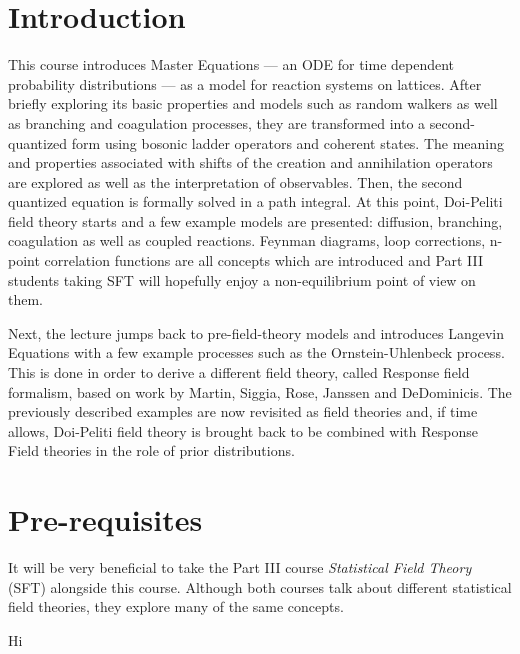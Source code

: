 \documentclass[a4paper,11pt]{article}
\begin{document}
	\maketitlepage
	\preliminaries

	\section*{Introduction}
	
	\noindent This course introduces Master Equations --- an ODE for time dependent probability distributions --- as a model for reaction systems on lattices. After briefly exploring its basic properties and models such as random walkers as well as branching and coagulation processes, they are transformed into a second-quantized form using bosonic ladder operators and coherent states. The meaning and properties associated with shifts of the creation and annihilation operators are explored as well as the interpretation of observables. Then, the second quantized equation is formally solved in a path integral. At this point, Doi-Peliti field theory starts and a few example models are presented: diffusion, branching, coagulation as well as coupled reactions. Feynman diagrams, loop corrections, n-point correlation functions are all concepts which are introduced and Part III students taking SFT will hopefully enjoy a non-equilibrium point of view on them.

	\noindent Next, the lecture jumps back to pre-field-theory models and introduces Langevin Equations with a few example processes such as the Ornstein-Uhlenbeck process. This is done in order to derive a different field theory, called Response field formalism, based on work by Martin, Siggia, Rose, Janssen and DeDominicis. The previously described examples are now revisited as field theories and, if time allows, Doi-Peliti field theory is brought back to be combined with Response Field theories in the role of prior distributions.

	\section*{Pre-requisites}

	It will be very beneficial to take the Part III course \emph{Statistical Field Theory} (SFT) alongside this course. Although both courses talk about different statistical field theories, they explore many of the same concepts.

	\newpage
	\tableofcontents
	\newpage
	\maintext
	Hi

	
\end{document}
